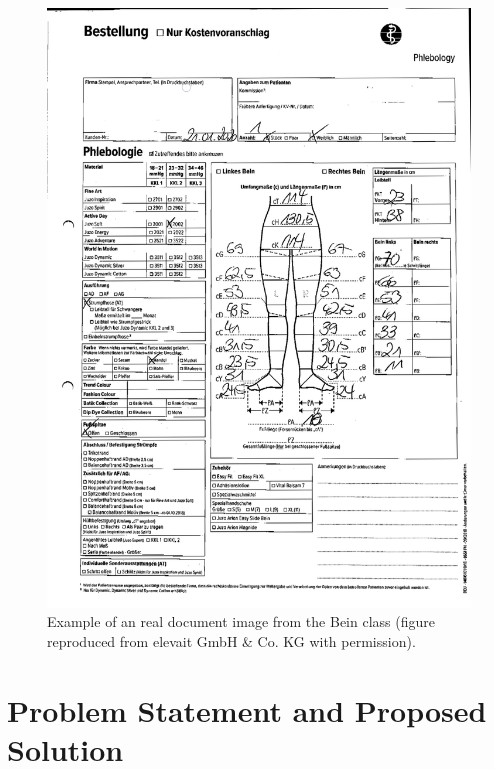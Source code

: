 \begin{figure}[H]
        \begin{center}
	       \includegraphics[scale=0.22]{images/Introduction/BeinRealImage.png}
    		\caption[Example of an real document image from the Bein class.]{Example of an real document image from the Bein class (figure reproduced from elevait GmbH \& Co. KG with permission).}
	      \label{fig:reallImageBein}
	    \end{center}
\end{figure}





\section{Problem Statement and Proposed Solution}\label{ProblemStatement}

